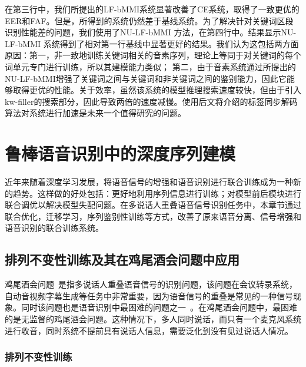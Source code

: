 在第三行中，我们所提出的LF-bMMI系统显著改善了CE系统，取得了一致更优的EER和FAF。但是，所得到的系统仍然差于基线系统。为了解决针对关键词区段识别性能差的问题，我们使用了NU-LF-bMMI 方法，在第四行中。结果显示NU-LF-bMMI 系统得到了相对第一行基线中显著更好的结果。我们认为这包括两方面原因：第一，非一致地训练关键词相关的音素序列，理论上等同于对关键词的每个词单元专门进行训练，所以其建模能力类似； 第二，由于音素系统通过所提出的NU-LF-bMMI增强了关键词之间与关键词和非关键词之间的鉴别能力，因此它能够取得更优的性能。关于效率，虽然该系统的模型推理搜索速度较快，但由于引入kw-filler的搜索部分，因此导致两倍的速度减慢。使用后文将介绍的标签同步解码算法对系统进行加速是未来一个值得研究的问题。


\section{鲁棒语音识别中的深度序列建模}
\label{chap:intro2-pit}

近年来随着深度学习发展，将语音信号的增强和语音识别进行联合训练成为一种新的趋势。这样做的好处包括：更好地利用序列信息进行训练；对模型前后模块进行联合调优以解决模型失配问题。在多说话人重叠语音信号识别任务中，本章节通过联合优化，迁移学习，序列鉴别性训练等方式，改善了原来语音分离、信号增强和语音识别的联合训练系统。

\subsection{排列不变性训练及其在鸡尾酒会问题中应用}
\label{chap:intro2-pit-pit}

鸡尾酒会问题~\cite{cherry1953some,bregman1994auditory}是指多说话人重叠语音信号的识别问题，该问题在会议转录系统，自动音视频字幕生成等任务中非常重要，因为语音信号的重叠是常见的一种信号现象。同时该问题也是语音识别中最困难的问题之一~\cite{wang2006computational,cooke2010monaural,du2014speech,weng2015deep}。在鸡尾酒会问题中，最困难的是无监督的鸡尾酒会问题。这种情况下，多人同时说话，而只有一个麦克风系统进行收音，同时系统不提前具有说话人信息，需要泛化到没有见过说话人情况。

\subsubsection{排列不变性训练}
\label{chap:intro2-pit-pit-intro}

